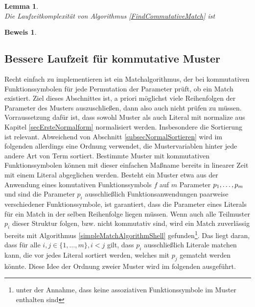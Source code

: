 \begin{algorithm}
\DontPrintSemicolon
\caption{$\mathrm{FindDilation} \colon M \times T \times \mathbb N \times \mathbb N \rightarrow \mathit{Bool}$}\label{FindDilation}
\end{algorithm}

\newtheorem{lemKomplexitaetKomm}[bsp]{Lemma}
\begin{lemKomplexitaetKomm}\label{lemKomplexitaetKomm}~\\
Die Laufzeitkomplexität von Algorithmus \ref{FindCommutativeMatch} ist 
\end{lemKomplexitaetKomm}

\newtheorem{bewKomplexitaetKomm}[bsp]{Beweis}
\begin{bewKomplexitaetKomm}~\\
\end{bewKomplexitaetKomm}

\subsection{Bessere Laufzeit für kommutative Muster} \label{subsecCMuster}

Recht einfach zu implementieren ist ein Matchalgorithmus, der bei kommutativen Funktionssymbolen für jede Permutation der Parameter prüft, ob ein Match existiert. Ziel dieses Abschnittes ist, a priori möglichst viele Reihenfolgen der Parameter des Musters auszuschließen, dann also auch nicht prüfen zu müssen. Vorraussetzung dafür ist, dass sowohl Muster als auch Literal mit $\mathrm{normalize}$ aus Kapitel \ref{secErsteNormalform} normalisiert werden. Insbesondere die Sortierung ist relevant. Abweichend von Abschnitt \ref{subsecNormalSortieren} wird im folgenden allerdings eine Ordnung verwendet, die Mustervariablen hinter jede andere Art von Term sortiert.
Bestimmte Muster mit kommutativen Funktionssymbolen können mit dieser einfachen Maßname bereits in linearer Zeit mit einem Literal abgeglichen werden. Besteht ein Muster etwa aus der Anwendung eines komutativen Funktionssymbols $f$ auf $m$ Parameter ${p}_{1}, \dots, {p}_{m}$ und sind die Parameter $p_i$ ausschließlich Funktionsanwendungen paarweise verschiedener Funktionssymbole, ist garantiert, dass die Parameter eines Literals für ein Match in der selben Reihenfolge liegen müssen. Wenn auch alle Teilmuster $p_i$ dieser Struktur folgen, bzw. nicht kommutativ sind, wird ein Match zuverlässig bereits mit Algorithmus \ref{simpleMatchAlgorithmShell} gefunden\footnote{unter der Annahme, dass keine assoziativen Funktionssymbole im Muster enthalten sind}. Das liegt daran, dass für alle $i, j \in \{1, \dots, m\}, i < j$ gilt, dass $p_i$ ausschließlich Literale matchen kann, die vor jedes Literal sortiert werden, welches mit $p_j$ gematcht werden könnte. Diese Idee der Ordnung zweier Muster wird im folgenden ausgeführt.


